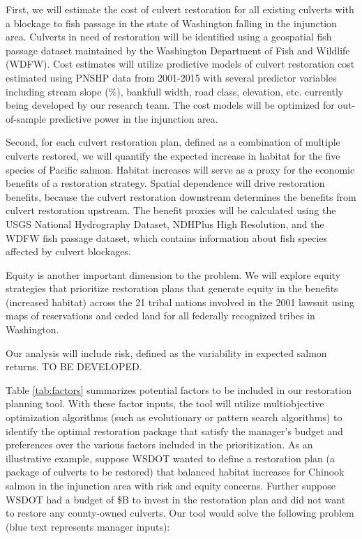 \documentclass[12pt]{elsarticle}
\begin{document}
First, we will estimate the cost of culvert restoration for all existing culverts with a blockage to fish passage in the state of Washington falling in the injunction area. Culverts in need of restoration will be identified using a geospatial fish passage dataset maintained by the Washington Department of Fish and Wildlife (WDFW). Cost estimates will utilize predictive models of culvert restoration cost estimated using PNSHP data from 2001-2015 with several predictor variables including stream slope (\%), bankfull width, road class, elevation, etc. currently being developed by our research team. The cost models will be optimized for out-of-sample predictive power in the injunction area.

Second, for each culvert restoration plan, defined as a combination of multiple culverts restored, we will quantify the expected increase in habitat for the five species of Pacific salmon. Habitat increases will serve as a proxy for the economic benefits of a restoration strategy. Spatial dependence will drive restoration benefits, because the culvert restoration downstream determines the benefits from culvert restoration upstream. The benefit proxies will be calculated using the USGS National Hydrography Dataset, NDHPlus High Resolution, and the WDFW fish passage dataset, which contains information about fish species affected by culvert blockages.

Equity is another important dimension to the problem. We will explore equity strategies that prioritize restoration plans that generate equity in the benefits (increased habitat) across the 21 tribal nations involved in the 2001 lawsuit using maps of reservations and ceded land for all federally recognized tribes in Washington. 

Our analysis will include risk, defined as the variability in expected salmon returns. TO BE DEVELOPED.

Table \ref{tab:factors} summarizes potential factors to be included in our restoration planning tool. With these factor inputs, the tool will utilize multiobjective optimization algorithms (such as evolutionary or pattern search algorithms) to identify the optimal restoration package that satisfy the manager's budget and preferences over the various factors included in the prioritization. As an illustrative example, suppose WSDOT wanted to define a restoration plan (a package of culverts to be restored) that balanced habitat increases for Chinook salmon in the injunction area with risk and equity concerns. Further suppose WSDOT had a budget of \$B to invest in the restoration plan and did not want to restore any county-owned culverts. Our tool would solve the following problem (blue text represents manager inputs):
\end{document}
